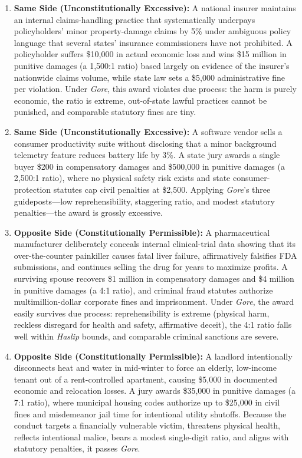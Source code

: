 \documentclass[12pt]{article}
\begin{document}
\begin{enumerate}
\item \textbf{Same Side (Unconstitutionally Excessive):} A national insurer maintains an internal claims-handling practice that systematically underpays policyholders' minor property-damage claims by 5\% under ambiguous policy language that several states' insurance commissioners have not prohibited. A policyholder suffers \$10,000 in actual economic loss and wins \$15 million in punitive damages (a 1,500:1 ratio) based largely on evidence of the insurer's nationwide claims volume, while state law sets a \$5,000 administrative fine per violation. Under \textit{Gore}, this award violates due process: the harm is purely economic, the ratio is extreme, out-of-state lawful practices cannot be punished, and comparable statutory fines are tiny.
\item \textbf{Same Side (Unconstitutionally Excessive):} A software vendor sells a consumer productivity suite without disclosing that a minor background telemetry feature reduces battery life by 3\%. A state jury awards a single buyer \$200 in compensatory damages and \$500,000 in punitive damages (a 2,500:1 ratio), where no physical safety risk exists and state consumer-protection statutes cap civil penalties at \$2,500. Applying \textit{Gore}'s three guideposts---low reprehensibility, staggering ratio, and modest statutory penalties---the award is grossly excessive.
\item \textbf{Opposite Side (Constitutionally Permissible):} A pharmaceutical manufacturer deliberately conceals internal clinical-trial data showing that its over-the-counter painkiller causes fatal liver failure, affirmatively falsifies FDA submissions, and continues selling the drug for years to maximize profits. A surviving spouse recovers \$1 million in compensatory damages and \$4 million in punitive damages (a 4:1 ratio), and criminal fraud statutes authorize multimillion-dollar corporate fines and imprisonment. Under \textit{Gore}, the award easily survives due process: reprehensibility is extreme (physical harm, reckless disregard for health and safety, affirmative deceit), the 4:1 ratio falls well within \textit{Haslip} bounds, and comparable criminal sanctions are severe.
\item \textbf{Opposite Side (Constitutionally Permissible):} A landlord intentionally disconnects heat and water in mid-winter to force an elderly, low-income tenant out of a rent-controlled apartment, causing \$5,000 in documented economic and relocation losses. A jury awards \$35,000 in punitive damages (a 7:1 ratio), where municipal housing codes authorize up to \$25,000 in civil fines and misdemeanor jail time for intentional utility shutoffs. Because the conduct targets a financially vulnerable victim, threatens physical health, reflects intentional malice, bears a modest single-digit ratio, and aligns with statutory penalties, it passes \textit{Gore}.

\end{enumerate}
\end{document}

